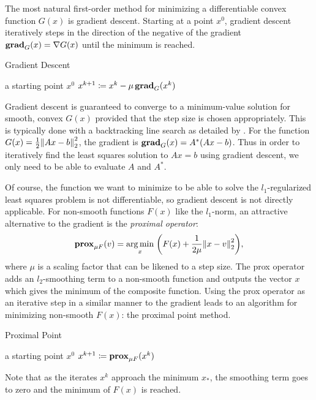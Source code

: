The most natural first-order method for minimizing a differentiable convex function $G(x)$ is gradient descent. Starting at a point $x^0$, gradient descent iteratively steps in the direction of the negative of the gradient $\operatorname{\mathbf{grad}}_{G}(x) = \nabla G(x)$ until the minimum is reached.
\begin{algorithm}[H]
 \caption{Gradient Descent \autocite{Boy04}}
 \begin{algorithmic}
  \GIVEN a starting point $x^0$
  \REPEAT
  \STATE $x^{k+1} \coloneqq x^{k} - \mu \operatorname{\mathbf{grad}}_{G}(x^{k})$ 
 \end{algorithmic}
\end{algorithm}\noindent
Gradient descent is guaranteed to converge to a minimum-value solution for smooth, convex $G(x)$ provided that the step size is chosen appropriately. This is typically done with a backtracking line search as detailed by \textcite{Boy04}. For the function $G(x) = \frac{1}{2}\norm{2}{Ax - b}^2$, the gradient is $\operatorname{\mathbf{grad}}_{G}(x) = A^*(Ax - b)$. Thus in order to iteratively find the least squares solution to $Ax=b$ using gradient descent, we only need to be able to evaluate $A$ and $A^*$.

Of course, the function we want to minimize to be able to solve the $l_1$-regularized least squares problem is not differentiable, so gradient descent is not directly applicable. For non-smooth functions $F(x)$ like the $l_1$-norm, an attractive alternative to the gradient is the \emph{proximal operator}:
\begin{equation}
 \prox_{\mu F} (v) = \argmin_{x} \; \paren*{F(x) + \frac{1}{2\mu} \norm{2}{x - v}^2},
\end{equation}
where $\mu$ is a scaling factor that can be likened to a step size. The prox operator adds an $l_2$-smoothing term to a non-smooth function and outputs the vector $x$ which gives the minimum of the composite function. Using the prox operator as an iterative step in a similar manner to the gradient leads to an algorithm for minimizing non-smooth $F(x)$: the proximal point method.
\begin{algorithm}[H]
 \caption{Proximal Point \autocite{PB13}}
 \begin{algorithmic}
  \GIVEN a starting point $x^0$
  \REPEAT
  \STATE $x^{k+1} \coloneqq \operatorname{\mathbf{prox}}_{\mu F}(x^{k})$ 
 \end{algorithmic}
\end{algorithm}\noindent
Note that as the iterates $x^{k}$ approach the minimum $x_*$, the smoothing term goes to zero and the minimum of $F(x)$ is reached.

